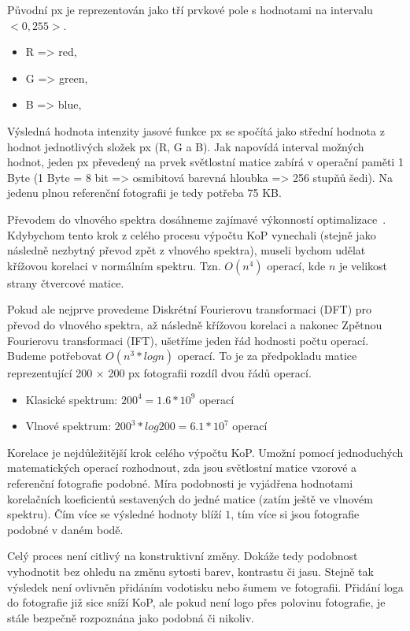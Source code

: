 Původní px je reprezentován jako tří prvkové pole s hodnotami na intervalu $ <0,255> $.
\begin{itemize}
	\setlength{\parskip}{0pt}
	\setlength{\itemsep}{0pt}
	\item R => red,
	\item G => green,
	\item B => blue,
\end{itemize}

Výsledná hodnota intenzity jasové funkce px se spočítá jako střední hodnota z hodnot jednotlivých složek px (R, G a B). Jak napovídá interval možných hodnot, jeden px převedený na prvek světlostní matice zabírá v operační paměti 1 Byte (1 Byte = 8 bit => osmibitová barevná hloubka => 256 stupňů šedi). Na jedenu plnou referenční fotografii je tedy potřeba 75 KB.

Převodem do vlnového spektra dosáhneme zajímavé výkonností optimalizace~\cite{FFT}. Kdybychom tento krok z celého procesu výpočtu KoP vynechali (stejně jako následně nezbytný převod zpět z vlnového spektra), museli bychom udělat křížovou korelaci v normálním spektru. Tzn. $ O(n^4) $ operací, kde $ n $ je velikost strany čtvercové matice.

Pokud ale nejprve provedeme Diskrétní Fourierovu transformaci (DFT) pro převod do vlnového spektra, až následně křížovou korelaci a nakonec Zpětnou Fourierovu transformaci (IFT), ušetříme jeden řád hodnosti počtu operací. Budeme potřebovat $ O(n^3 * logn) $ operací. To je za předpokladu matice reprezentující 200 × 200 px fotografii rozdíl dvou řádů operací.
\begin{itemize}
	\setlength{\parskip}{0pt}
	\setlength{\itemsep}{0pt}
	\item{Klasické spektrum: $ 200^4 = 1.6 * 10^9 $ operací}
	\item{Vlnové spektrum: $ 200^3 * log 200 = 6.1 * 10^7 $ operací}
\end{itemize}

Korelace je nejdůležitější krok celého výpočtu KoP. Umožní pomocí jednoduchých matematických operací rozhodnout, zda jsou světlostní matice vzorové a referenční fotografie podobné. Míra podobnosti je vyjádřena hodnotami korelačních koeficientů sestavených do jedné matice (zatím ještě ve vlnovém spektru). Čím více se výsledné hodnoty blíží $ 1 $, tím více si jsou fotografie podobné v daném bodě.

Celý proces není citlivý na konstruktivní změny. Dokáže tedy podobnost vyhodnotit bez ohledu na změnu sytosti barev, kontrastu či jasu. Stejně tak výsledek není ovlivněn přidáním vodotisku nebo šumem ve fotografii. Přidání loga do fotografie již sice sníží KoP, ale pokud není logo přes polovinu fotografie, je stále bezpečně rozpoznána jako podobná či nikoliv.

